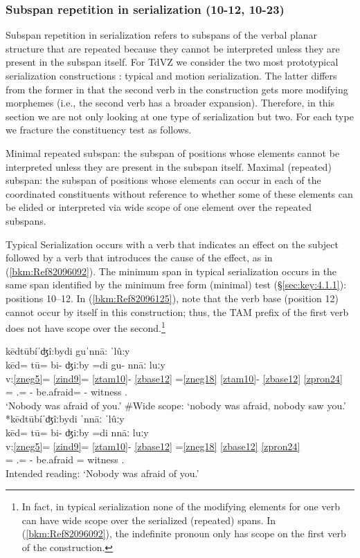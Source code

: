 \documentclass[output=paper]{langscibook}
\begin{document}
\subsubsection{Subspan repetition in serialization (10-12, 10-23)}

Subspan repetition in serialization refers to subspans of the verbal planar structure that are repeated because they cannot be interpreted unless they are present in the subspan itself. For TdVZ we consider the two most prototypical serialization constructions \citep{Gutierrez-Lorenzo2014}: typical and motion serialization. The latter differs from the former in that the second verb in the construction gets more modifying morphemes (i.e., the second verb has a broader expansion). Therefore, in this section we are not only looking at one type of serialization but two. For each type we fracture the constituency test as follows.

\ea Minimal repeated subspan: the subspan of positions whose elements cannot be interpreted unless they are present in the subspan itself. 
\ex Maximal (repeated) subspan: the subspan of positions whose elements can occur in each of the coordinated constituents without reference to whether some of these elements can be elided or interpreted via wide scope of one element over the repeated subspans.
\z 

Typical Serialization occurs with a verb that indicates an effect on the subject followed by a verb that introduces the cause of the effect, as in (\ref{bkm:Ref82096092}). The minimum span in typical serialization occurs in the same span identified by the minimum free form (minimal) test (\S\ref{sec:key:4.1.1}): positions 10–12. In (\ref{bkm:Ref82096125}), note that the verb base (position 12) cannot occur by itself in this construction; thus, the TAM prefix of the first verb does not have scope over the second.\footnote{In fact, in typical serialization none of the modifying elements for one verb can have wide scope over the serialized (repeated) spans. In (\ref{bkm:Ref82096092}), the indefinite pronoun only has scope on the first verb of the construction.} 

\ea\label{bkm:Ref82096092} 
{kēdtūbíˈʤî:bydi guˈnnā: ˈlû:y} \\ 
\glll kēd= tū= bi- ʤiːby =di gu- nnāː luːy\\
v:\ref{zneg5}= \ref{zind9}= \ref{ztam10}{}- \ref{zbase12} =\ref{zneg18} \ref{ztam10}{}- \ref{zbase12} \ref{zpron24} \\ 
\Neg{}= \Indf.\Pron{}= \Compl{}- be.afraid= \Neg{} \Compl{}- witness \Second\Sg{}.\Inf{} \\ 
\glt `Nobody was afraid of you.' \#Wide scope: `nobody was afraid, nobody saw you.' 
\ex\label{bkm:Ref82096125}
{*kēdtūbíˈʤîːbydi ˈnnāː ˈlûːy} \\
\glll kēd= tū= bi- ʤiːby =di nnāː luːy\\ 
v:\ref{zneg5}= \ref{zind9}= \ref{ztam10}{}- \ref{zbase12} =\ref{zneg18} \ref{zbase12} \ref{zpron24} \\ 
\Neg{}= \Indf.\Pron{}= \Compl{}- be.afraid =\Neg{} witness \Second\Sg{}.\Inf{}\\
\glt Intended reading: `Nobody was afraid of you.'
\z
\end{document}
